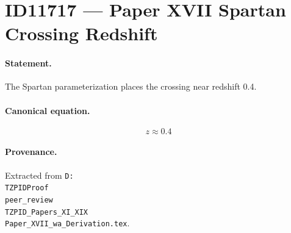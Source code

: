\section*{ID11717 --- Paper XVII Spartan Crossing Redshift}

\paragraph{Statement.}
The Spartan parameterization places the crossing near redshift 0.4.

\paragraph{Canonical equation.}
\[
z\approx0.4
\]

\paragraph{Provenance.}
Extracted from \texttt{D:\\TZPIDProof\\peer\_review\\TZPID\_Papers\_XI\_XIX\\Paper\_XVII\_wa\_Derivation.tex}.
